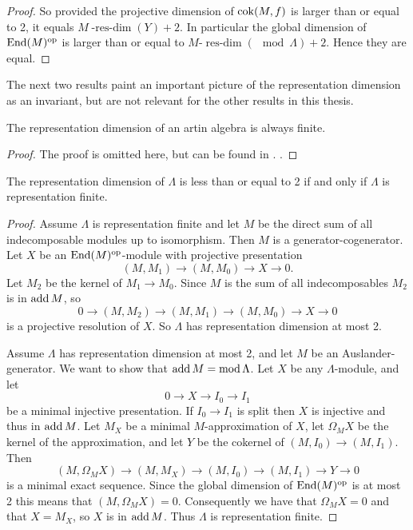 \begin{prop}
\begin{proof}
		So provided the projective dimension of $\operatorname{cok}(M,f)$ is larger than or equal to 2, it equals $M\operatorname{-res-dim}(Y)+2$. In particular the global dimension of $\operatorname{End}(M)^{\operatorname{op}}$ is larger than or equal to $M$-$\operatorname{res-dim}(\mod \Lambda) + 2$. Hence they are equal.
	\end{proof}
\end{prop}

The next two results paint an important picture of the representation dimension as an invariant, but are not relevant for the other results in this thesis.

\begin{theorem}
	The representation dimension of an artin algebra is always finite.
	\begin{proof}
		The proof is omitted here, but can be found in \cite{Iya02}. .
	\end{proof}
\end{theorem}

\begin{prop}
	The representation dimension of $\Lambda$ is less than or equal to 2 if and only if $\Lambda$ is representation finite.
	\begin{proof}
		Assume $\Lambda$ is representation finite and let $M$ be the direct sum of all indecomposable modules up to isomorphism. Then $M$ is a generator-cogenerator. Let $X$ be an $\operatorname{End}(M)^{\operatorname{op}}$-module with projective presentation 
		$$(M,M_1) \to (M, M_0) \to X \to 0.$$ 
		Let $M_2$ be the kernel of $M_1 \to M_0$. Since $M$ is the sum of all indecomposables $M_2$ is in $\operatorname{add} M$, so 
		$$0 \to (M, M_2) \to (M,M_1) \to (M, M_0) \to X \to 0$$ 
		is a projective resolution of $X$. So $\Lambda$ has representation dimension at most 2.
		
		Assume $\Lambda$ has representation dimension at most 2, and let $M$ be an Auslander-generator. We want to show that $\operatorname{add} M = \operatorname{mod}\Lambda$. Let $X$ be any $\Lambda$-module, and let $$0 \to X \to I_0 \to I_1$$ be a minimal injective presentation. If $I_0 \to I_1$ is split then $X$ is injective and thus in $\operatorname{add} M$. Let $M_X$ be a minimal $M$-approximation of $X$, let $\Omega_M X$ be the kernel of the approximation, and let $Y$ be the cokernel of $(M, I_0) \to (M, I_1)$. Then $$(M,\Omega_M X) \to (M,M_X) \to (M, I_0) \to (M, I_1) \to Y \to 0$$ is a minimal exact sequence. Since the global dimension of $\operatorname{End}(M)^{\operatorname{op}}$ is at most 2 this means that $(M, \Omega_M X)=0$. Consequently we have that $\Omega_M X = 0$ and that $X=M_X$, so $X$ is in $\operatorname{add} M$. Thus $\Lambda$ is representation finite.
	\end{proof}
\end{prop}

